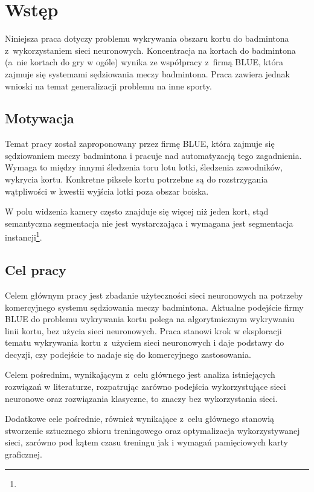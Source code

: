 \chapter{Wstęp}

Niniejsza praca dotyczy problemu wykrywania obszaru kortu do badmintona z~wykorzystaniem sieci neuronowych.
Koncentracja na kortach do badmintona (a~nie kortach do gry w ogóle) wynika ze współpracy z~firmą BLUE, która zajmuje się systemami sędziowania meczy badmintona.
Praca zawiera jednak wnioski na temat generalizacji problemu na inne sporty.

\section{Motywacja}

Temat pracy został zaproponowany przez firmę BLUE, która zajmuje się sędziowaniem meczy badmintona i pracuje nad automatyzacją tego zagadnienia.
Wymaga to między innymi śledzenia toru lotu lotki, śledzenia zawodników, wykrycia kortu.
Konkretne piksele kortu potrzebne są do rozstrzygania wątpliwości w kwestii wyjścia lotki poza obszar boiska.

W polu widzenia kamery często znajduje się więcej niż jeden kort, stąd semantyczna segmentacja nie jest wystarczająca i wymagana jest segmentacja instancji\footnote{}.

\section{Cel pracy}

Celem głównym pracy jest zbadanie użyteczności sieci neuronowych na potrzeby komercyjnego systemu sędziowania meczy badmintona.
Aktualne podejście firmy BLUE do problemu wykrywania kortu polega na algorytmicznym wykrywaniu linii kortu, bez użycia sieci neuronowych.
Praca stanowi krok w eksploracji tematu wykrywania kortu z~użyciem sieci neuronowych i daje podstawy do decyzji, czy podejście to nadaje się do komercyjnego zastosowania.

Celem pośrednim, wynikającym z~celu głównego jest analiza istniejących rozwiązań w literaturze, rozpatrując zarówno podejścia wykorzystujące sieci neuronowe oraz rozwiązania klasyczne, to znaczy bez wykorzystania sieci.

Dodatkowe cele pośrednie, również wynikające z~celu głównego stanowią stworzenie sztucznego zbioru treningowego oraz optymalizacja wykorzystywanej sieci, zarówno pod kątem czasu treningu jak i wymagań pamięciowych karty graficznej.

